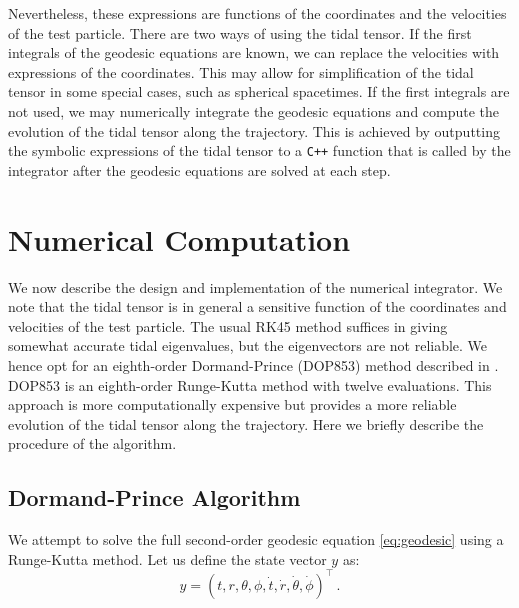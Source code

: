 \documentclass[11pt, twocolumn]{article}
\begin{document}
Nevertheless, these expressions are functions of the coordinates and the velocities of the test particle. There are two ways of using the tidal tensor. If the first integrals of the geodesic equations are known, we can replace the velocities with expressions of the coordinates. This may allow for simplification of the tidal tensor in some special cases, such as spherical spacetimes. If the first integrals are not used, we may numerically integrate the geodesic equations and compute the evolution of the tidal tensor along the trajectory. This is achieved by outputting the symbolic expressions of the tidal tensor to a \texttt{C++} function that is called by the integrator after the geodesic equations are solved at each step.


\section{Numerical Computation} \label{sec:numerical}


We now describe the design and implementation of the numerical integrator. We note that the tidal tensor is in general a sensitive function of the coordinates and velocities of the test particle. The usual RK45 method suffices in giving somewhat accurate tidal eigenvalues, but the eigenvectors are not reliable. We hence opt for an eighth-order Dormand-Prince (DOP853) method described in \cite{Press2007}. DOP853 is an eighth-order Runge-Kutta method with twelve evaluations. This approach is more computationally expensive but provides a more reliable evolution of the tidal tensor along the trajectory. Here we briefly describe the procedure of the algorithm.


\subsection{Dormand-Prince Algorithm}


We attempt to solve the full second-order geodesic equation \eqref{eq:geodesic} using a Runge-Kutta method. Let us define the state vector $y$ as:
\begin{equation}
    y = (t, r, \theta, \phi, \dot{t}, \dot{r}, \dot{\theta}, \dot{\phi})^{\intercal} \, .
\end{equation}
\end{document}
